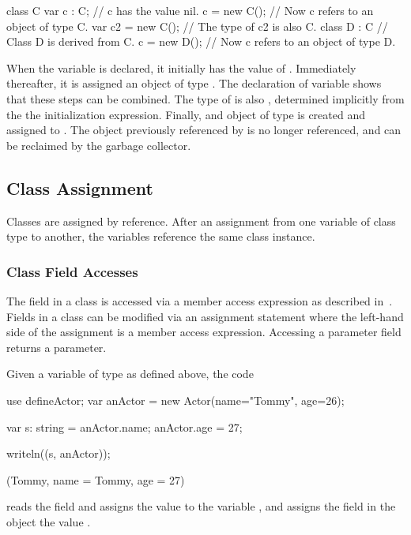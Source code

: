 \begin{example}
\begin{chapelpre}
\end{chapelpre}
\begin{chapel}
class C { }
var c : C;	// c has the value nil.
c = new C();	// Now c refers to an object of type C.
var c2 = new C();	// The type of c2 is also C.
class D : C {}	// Class D is derived from C.
c = new D();	// Now c refers to an object of type D.
\end{chapel}
\begin{chapeloutput}
\end{chapeloutput}
When the variable  is declared, it initially has the value
of .  Immediately thereafter, it is assigned an object of
type .  The declaration of variable  shows that these steps can
be combined.  The type of  is also , determined implicitly from
the the initialization expression.  Finally, and object of type  is created and
assigned to .  The object previously referenced by  is no longer
referenced, and can be reclaimed by the garbage collector.
\end{example}

\subsection{Class Assignment}
\label{Class_Assignment}

Classes are assigned by reference.  After an assignment from one
variable of class type to another, the variables reference the same
class instance.

\subsubsection{Class Field Accesses}
\label{Class_Field_Accesses}

The field in a class is accessed via a member access expression as
described in~.  Fields in a class can
be modified via an assignment statement where the left-hand side of
the assignment is a member access expression.
Accessing a parameter field returns a parameter.
\begin{example}
Given a variable  of type  as defined above,
the code
\begin{chapelpre}
use defineActor;
var anActor = new Actor(name="Tommy", age=26);
\end{chapelpre}
\begin{chapel}
var s: string = anActor.name;
anActor.age = 27;
\end{chapel}
\begin{chapelpost}
writeln((s, anActor));
\end{chapelpost}
\begin{chapeloutput}
(Tommy, {name = Tommy, age = 27})
\end{chapeloutput}
reads the field  and assigns the value to the variable
, and assigns the field  in the object
 the value .
\end{example}

